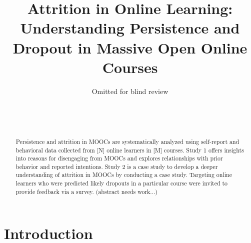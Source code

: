 \documentclass{sigchi}\usepackage[]{graphicx}\usepackage[]{color}
\begin{document}
\title{Attrition in Online Learning: Understanding Persistence and Dropout in Massive Open Online Courses}

\author{
  \alignauthor Omitted for blind review\\
  \\
  \\
  \\
}

\maketitle

\begin{abstract}
Persistence and attrition in MOOCs are systematically analyzed using self-report and behavioral data collected from [N] online learners in [M] courses. Study 1 offers insights into reasons for disengaging from MOOCs and explores relationships with prior behavior and reported intentions. Study 2 is a case study to develop a deeper understanding of attrition in MOOCs by conducting a case study. Targeting online learners who were predicted likely dropouts in a particular course were invited to provide feedback via a survey. (abstract needs work...)
\end{abstract}



\section{Introduction}
\end{document}
